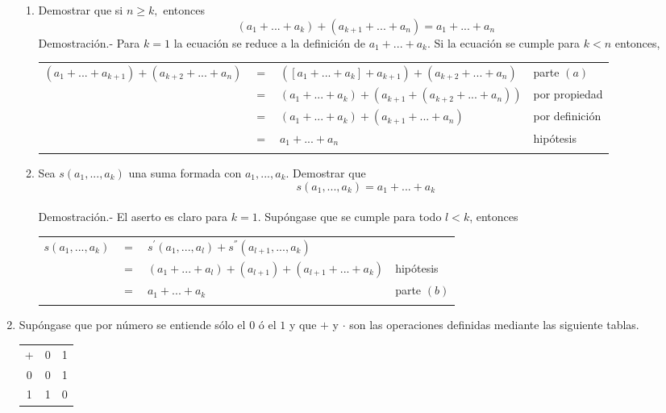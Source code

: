 \begin{enumerate}[\bfseries 1.]
\begin{enumerate}[\bfseries (a)]
\item Demostrar que si $n\geq k,$ entonces $$(a_1+...+a_k) + (a_{k+1} + ... + a_n) = a_1 + ... + a_n$$
Demostración.- \; Para $k=1$ la ecuación se reduce a la definición de $a_1+...+a_k$. Si la ecuación se cumple para $k<n$ entonces,
\begin{center}
\begin{tabular}{r c l l}
$(a_1+...+a_{k+1})+(a_{k+2}+...+a_n)$&$=$&$([a_1+...+a_k]+a_{k+1}) + (a_{k+2}+...+a_n)$&parte $(a)$\\
&$=$&$(a_1+...+a_k)+(a_{k+1}+(a_{k+2}+...+a_n))$&por propiedad \\
&$=$&$(a_1+...+a_k)+(a_{k+1}+...+a_n)$&por definición\\
&$=$&$a_1+...+a_n$&hipótesis\\\\
\end{tabular}
\end{center}

\item Sea $s(a_1,...,a_k)$ una suma formada con $a_1,...,a_k$. Demostrar que $$s(a_1,...,a_k) = a_1+...+a_k$$\\
Demostración.-\; El aserto es claro para $k=1$. Supóngase que se cumple para todo $l<k$, entonces
\begin{center}
\begin{tabular}{rcll}
$s(a_1,...,a_k)$&$=$&$s^{'}(a_1,...,a_l)+ s^{''}(a_{l+1},...,a_k)$&\\
&$=$&$(a_1+...+a_l)+(a_{l+1})+(a_{l+1}+...+a_k)$&hipótesis\\
&$=$&$a_1+...+a_k$&parte $(b)$\\\\
\end{tabular}
\end{center}
\end{enumerate}

\item Supóngase que por número se entiende sólo el $0$ ó el $1$ y que $+$ y $\cdot$ son las operaciones definidas mediante las siguiente tablas.
\begin{multicols}{2}
\begin{center}
\begin{tabular}{c c c }
+&0&1\\
0&0&1\\
1&1&0\\
\end{tabular}
\end{center}


\end{multicols}
\end{enumerate}
